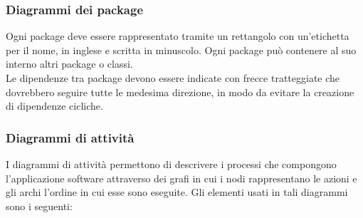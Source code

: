     	\subsubsection*{Diagrammi dei package}
    	Ogni package deve essere rappresentato tramite un rettangolo con un'etichetta per il nome, in inglese e scritta in minuscolo. Ogni package può contenere al suo interno altri package o classi. \\
    	Le dipendenze tra package devono essere indicate con frecce tratteggiate che dovrebbero seguire tutte le medesima direzione, in modo da evitare la creazione di dipendenze cicliche.

    	\subsubsection*{Diagrammi di attività}
    	I diagrammi di attività permettono di descrivere i processi che compongono l'applicazione software attraverso dei grafi in cui i nodi rappresentano le azioni e gli archi l'ordine in cui esse sono eseguite.
    	Gli elementi usati in tali diagrammi sono i seguenti:
